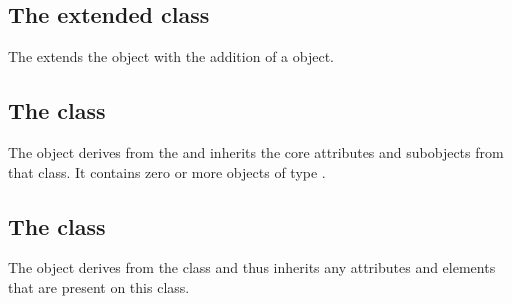 \subsection{The extended  class}
\label{compartment-class}




The \FooPackage extends the  object with the addition
of
a \ListOfPears object.

\subsection{The  class}
\label{listofpears-class}


The \ListOfPears object derives from the  and inherits the
core attributes and subobjects from that class. It contains zero or more
objects of type \Pear.

\subsection{The  class}
\label{pear-class}




The \Pear object derives from the \SBase class and thus inherits any
attributes and elements that are present on this class.
